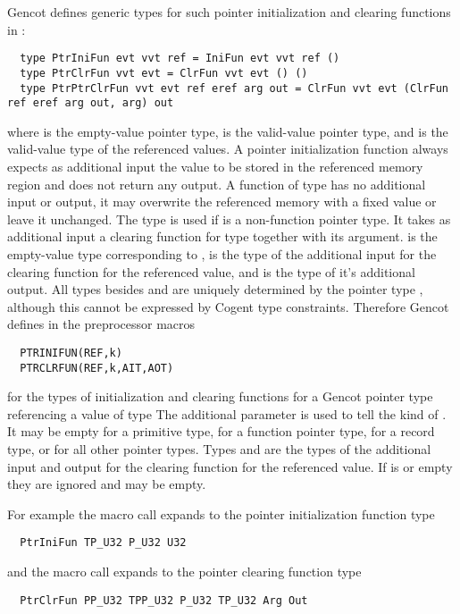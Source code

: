 Gencot defines generic types for such pointer initialization and clearing functions in :
\begin{verbatim}
  type PtrIniFun evt vvt ref = IniFun evt vvt ref ()
  type PtrClrFun vvt evt = ClrFun vvt evt () ()
  type PtrPtrClrFun vvt evt ref eref arg out = ClrFun vvt evt (ClrFun ref eref arg out, arg) out
\end{verbatim}
where  is the empty-value pointer type,  is the valid-value pointer type, and  is the valid-value
type of the referenced values. A pointer initialization function always expects as additional input the value to be stored in
the referenced memory region and does not return any output. A function of type  has no additional input or output, it may overwrite the referenced memory
with a fixed value or leave it unchanged. The type  is used if  is a non-function pointer type. It takes 
as additional input a clearing function for type  together with its argument.  is the empty-value type
corresponding to ,  is the type of the additional input for the clearing function for the referenced value,
and  is the type of it's additional output.
All types besides  and  are uniquely determined by the 
pointer type , although this cannot be expressed by Cogent type constraints. Therefore Gencot  defines in 
 the preprocessor macros
\begin{verbatim}
  PTRINIFUN(REF,k)
  PTRCLRFUN(REF,k,AIT,AOT)
\end{verbatim}
for the types of initialization and clearing functions for a Gencot pointer type referencing a value of type 
The additional parameter  is used to tell the kind of . It may be empty for a primitive type,
 for a function pointer type,  for a record type, or  for all other pointer types. Types 
and 
are the types of the additional input and output for the clearing function for the referenced value. If  is  or
empty they are ignored and may be empty.

For example the macro call  expands to the pointer initialization function type
\begin{verbatim}
  PtrIniFun TP_U32 P_U32 U32
\end{verbatim}
and the macro call  expands to the pointer clearing function type
\begin{verbatim}
  PtrClrFun PP_U32 TPP_U32 P_U32 TP_U32 Arg Out
\end{verbatim}

